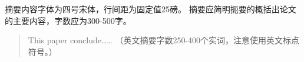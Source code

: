 \begin{摘要}
    摘要内容字体为四号宋体，行间距为固定值25磅。
    摘要应简明扼要的概括出论文的主要内容，字数应为300-500字。
\end{摘要}
\begin{abstract}
    This paper conclude……
    （英文摘要字数250-400个实词，注意使用英文标点符号。）
\end{abstract}
